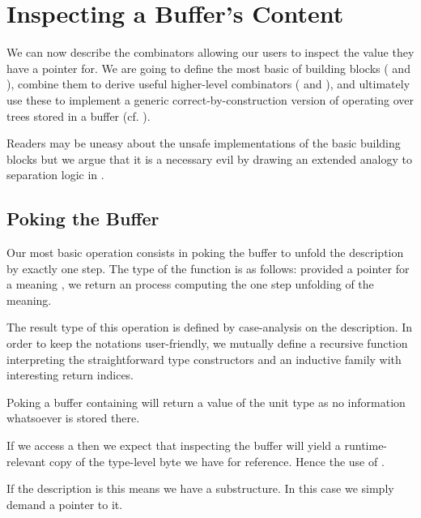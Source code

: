 
\section{Inspecting a Buffer's Content}\label{sec:poking}

We can now describe the combinators allowing our users to inspect
the value they have a pointer for.
%
We are going to define the most basic of building blocks
( and ),
combine them to derive useful higher-level combinators
( and ),
and ultimately use these to implement a generic correct-by-construction
version of  operating over trees stored in a buffer
(cf. ).

Readers may be uneasy about the unsafe implementations of the basic
building blocks but we argue that it is a necessary evil by drawing
an extended analogy to separation logic in .

\subsection{Poking the Buffer}

Our most basic operation consists in poking the buffer to unfold
the description by exactly one step.
%
The type of the function is as follows: provided a pointer for
a meaning , we return an  process computing
the one step unfolding of the meaning.


The result type of this operation is defined by case-analysis on the
description. In order to keep the notations user-friendly, we
mutually define
a recursive function  interpreting the straightforward type constructors
and an inductive family  with interesting return indices.


Poking a buffer containing  will return a value of
the unit type as no information whatsoever is stored there.

If we access a  then we expect that inspecting the
buffer will yield a runtime-relevant copy of the type-level byte we
have for reference. Hence the use of .

If the description is  this means
we have a substructure. In this case we simply demand a pointer to it.

